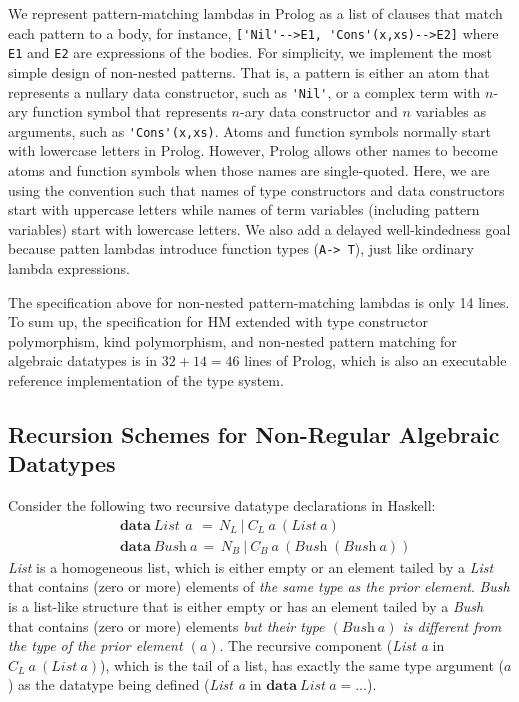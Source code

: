 \documentclass[runningheads,a4paper]{llncs}
\begin{document}
We represent pattern-matching lambdas in Prolog as a list of clauses
that match each pattern to a body, for instance,
\verb|['Nil'-->E1, 'Cons'(x,xs)-->E2]|
where \verb|E1| and \verb|E2| are expressions of the bodies. For simplicity,
we implement the most simple design of non-nested patterns. That is,
a pattern is either an atom that represents a nullary data constructor,
such as \verb|'Nil'|, or a complex term with $n$-ary function symbol
that represents $n$-ary data constructor and $n$ variables as arguments,
such as \verb|'Cons'(x,xs)|.
Atoms and function symbols normally start with lowercase letters in Prolog.
However, Prolog allows other names to become atoms and function symbols
when those names are single-quoted. Here, we are using the convention
such that names of type constructors and data constructors start with 
uppercase letters while names of term variables (including pattern variables)
start with lowercase letters. We also add a delayed well-kindedness goal
because patten lambdas introduce function types (\verb|A-> T|), just like
ordinary lambda expressions.

The specification above for non-nested pattern-matching lambdas
is only 14 lines. To sum up, the specification for HM extended
with type constructor polymorphism, kind polymorphism, and
non-nested pattern matching for algebraic datatypes is in $32+14=46$
lines of Prolog, which is also an executable reference implementation
of the type system.

\subsection{Recursion Schemes for Non-Regular Algebraic Datatypes}
\label{ssec:mit}
Consider the following two recursive datatype declarations in Haskell:
\begin{align*}
& \textbf{data}~\textit{List}~\,a~
      \,=\, N_{\!L}
       ~|~  C_{\!L}~a~(\textit{List}~a)\\
& \textbf{data}~\textit{Bush}~a
      \,=\, N_{\!B}
       ~|~  C_{\!B}~a~(\textit{Bush}\;(\textit{Bush}~a))
\end{align*}
\textit{List} is a homogeneous list, which is either empty
or an element tailed by a \textit{List} that contains (zero or more)
elements of \emph{the same type as the prior element}.
\textit{Bush} is a list-like structure that is either empty
or has an element tailed by a \textit{Bush} that contains (zero or more) 
elements \emph{but their type $(\textit{Bush}~a)$ is different from 
the type of the prior element $(a)$}.
The recursive component (\textit{List a} in $C_{\!L}~a~(\textit{List}~a)$),
which is the tail of a list, has exactly the same type argument ($a$) as
the datatype being defined
(\textit{List a} in $\textbf{data}~\textit{List}~a = \ldots$).
\end{document}

